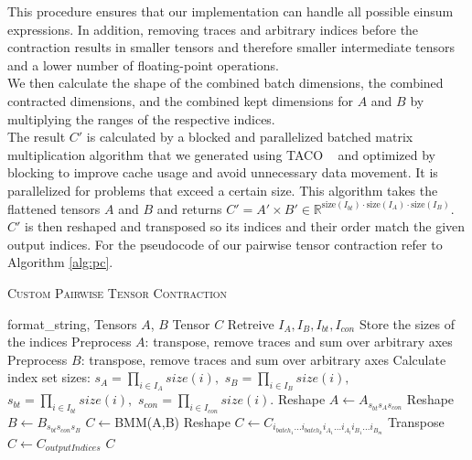This procedure ensures that our implementation can handle all possible einsum expressions. In addition, removing traces and arbitrary indices before the contraction results in smaller tensors and therefore smaller intermediate tensors and a lower number of floating-point operations.\\
 We then calculate the shape of the combined batch dimensions, the combined contracted dimensions, and the combined kept dimensions for $A$ and $B$ by multiplying the ranges of the respective indices.\\
 The result $C'$ is calculated by a blocked and parallelized batched matrix multiplication algorithm that we generated using TACO ~\cite{kjolstad2017taco} and optimized by blocking to improve cache usage and avoid unnecessary data movement. It is parallelized for problems that exceed a certain size. This algorithm takes the flattened tensors $A$ and $B$ and returns  $C' = A' \times B' \in \mathbb{R}^{\text{size}(I_{bt}) \cdot \text{size}(I_A) \cdot \text{size}(I_B)}$. $C'$ is then reshaped and transposed so its indices and their order match the given output indices. For the pseudocode of our pairwise tensor contraction refer to Algorithm \ref{alg:pc}.  \\
 \begin{algorithm}[H]
    \caption{\textsc{Custom Pairwise Tensor Contraction}}
        \label{alg:pc}
    \begin{algorithmic}[1]
        \REQUIRE format\_string, Tensors $A$, $B$
            \ENSURE Tensor $C$
            \STATE Retreive $I_A , I_B , I_{bt} , I_{con}$
            \STATE Store the sizes of the indices
            \STATE Preprocess $A$: transpose, remove traces and sum over arbitrary axes
            \STATE Preprocess $B$: transpose, remove traces and sum over arbitrary axes
            \STATE Calculate index set sizes: $s_A = \textstyle{\prod\limits_{i\in I_A} size(i)},$ 
            \STATE $s_B = \textstyle{\prod\limits_{i\in I_B} size(i)},$ 
            \STATE $s_{bt} = \textstyle{\prod\limits_{i\in I_{bt}} size(i)},$ 
            \STATE $s_{con} = \textstyle{\prod\limits_{i\in I_{con}} size(i)}.$
            \STATE Reshape $A \leftarrow A_{s_{bt} s_A s_{con}}$
            \STATE Reshape $B \leftarrow B_{s_{bt} s_{con} s_B}$
            \STATE $C\leftarrow$\textsc{BMM}(A,B)
            \STATE Reshape $C\leftarrow C_{i_{{batch}_1}...i_{{batch}_k} i_{{A}_1} ...i_{{A}_l} i_{B_1} ...i_{B_m}}$
            \STATE Transpose $C\leftarrow C_{outputIndices}$
            \RETURN $C$
    \end{algorithmic}
\end{algorithm}
    

